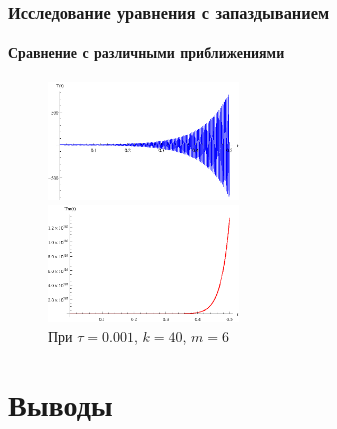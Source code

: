 \documentclass{beamer}
\numberwithin{equation}{section}
\begin{document}
    \begin{frame}
        \frametitle{Исследование уравнения с запаздыванием}
        \framesubtitle{Сравнение с различными приближениями}

        \begin{figure}[h]
        \begin{center}
            \includegraphics[width=0.45\textwidth]{not_applicable_init.eps}
        \end{center}
        \begin{center}
            \includegraphics[width=0.45\textwidth]{not_applicable_m.eps}
        \end{center}
        \caption{При $\tau=0.001$, $k=40$, $m=6$}
        \end{figure}

    \end{frame}

    \section{Выводы}
\end{document}
